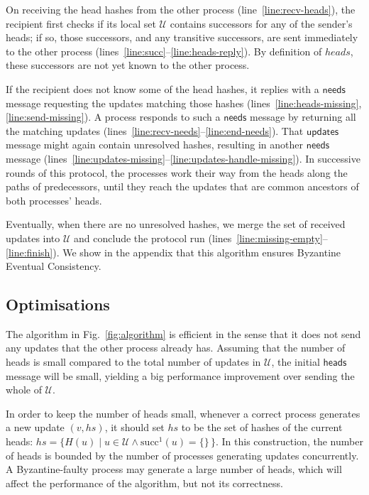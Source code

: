 \documentclass[manuscript,anonymous]{acmart}
\begin{document}
On receiving the head hashes from the other process (line~\ref{line:recv-heads}), the recipient first checks if its local set $\mathcal{U}$ contains successors for any of the sender's heads; if so, those successors, and any transitive successors, are sent immediately to the other process (lines~\ref{line:succ}--\ref{line:heads-reply}).
By definition of $\mathit{heads}$, these successors are not yet known to the other process.

If the recipient does not know some of the head hashes, it replies with a $\mathsf{needs}$ message requesting the updates matching those hashes (lines~\ref{line:heads-missing}, \ref{line:send-missing}).
A process responds to such a $\mathsf{needs}$ message by returning all the matching updates (lines~\ref{line:recv-needs}--\ref{line:end-needs}).
That $\mathsf{updates}$ message might again contain unresolved hashes, resulting in another $\mathsf{needs}$ message (lines~\ref{line:updates-missing}--\ref{line:updates-handle-missing}).
In successive rounds of this protocol, the processes work their way from the heads along the paths of predecessors, until they reach the updates that are common ancestors of both processes' heads.

Eventually, when there are no unresolved hashes, we merge the set of received updates into $\mathcal{U}$ and conclude the protocol run (lines~\ref{line:missing-empty}--\ref{line:finish}).
We show in the appendix that this algorithm ensures Byzantine Eventual Consistency.

\subsection{Optimisations}\label{sec:optimisations}

The algorithm in Fig.~\ref{fig:algorithm} is efficient in the sense that it does not send any updates that the other process already has.
Assuming that the number of heads is small compared to the total number of updates in $\mathcal{U}$, the initial $\mathsf{heads}$ message will be small, yielding a big performance improvement over sending the whole of $\mathcal{U}$.

In order to keep the number of heads small, whenever a correct process generates a new update $(v, \mathit{hs})$, it should set $\mathit{hs}$ to be the set of hashes of the current heads:
$\mathit{hs} = \{H(u) \mid u \in \mathcal{U} \wedge \mathrm{succ}^1(u) = \{\}\,\}$.
In this construction, the number of heads is bounded by the number of processes generating updates concurrently.
A Byzantine-faulty process may generate a large number of heads, which will affect the performance of the algorithm, but not its correctness.
\end{document}

